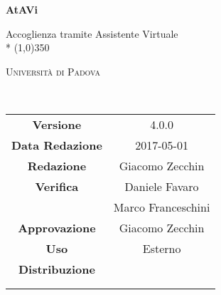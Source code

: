 \documentclass[a4paper,12pt]{article}
\date{2017/05/01}
\begin{document}
	\begin{titlepage}
		\centering
		{\huge\bfseries AtAVi\par}
		Accoglienza tramite Assistente Virtuale \\*
		\line(1,0){350} \\
		{\scshape\LARGE Università di Padova \par}
		\vspace{1cm}
		{\scshape\Large \pianodiprogettoRA\ \par}
		\logo
		\newpage
		\begin{tabular}{c|c}
			{\hfill \textbf{Versione}} 			& 4.0.0			\\ 
			{\hfill\textbf{Data Redazione}} 	& 2017-05-01 		\\ 
			{\hfill\textbf{Redazione}} 			& Giacomo Zecchin \\
			{\hfill\textbf{Verifica}} 			& Daniele Favaro \\ & Marco Franceschini \\ 
			{\hfill\textbf{Approvazione}} 		& Giacomo Zecchin \\
			{\hfill\textbf{Uso}} 				& Esterno 			\\
			{\hfill\textbf{Distribuzione}} 		& \vardanega \\ & \cardin \\ & \prop \\
		\end{tabular}
	\end{titlepage}
	
	\pagestyle{myfront}
	\newpage	
			

	\newpage
		\tableofcontents 	%
	\newpage
		\listoftables 		%
	\newpage	
		\listoffigures		%
	
	\label{LastFrontPage}
		\newpage
		\pagestyle{mymain}
		
			
		\newpage	
			
		\newpage			
			
		\newpage			
			
		\newpage			
			
		\newpage
			

	\label{LastPage}
\end{document}
